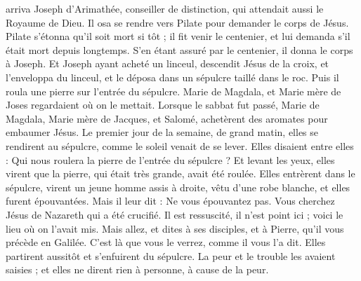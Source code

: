 \begin{multicols}{2}
arriva Joseph d'Arimathée, conseiller de distinction, qui attendait aussi le Royaume de Dieu. Il osa se rendre vers Pilate pour demander le corps de Jésus.
Pilate s'étonna qu'il soit mort si tôt ; il fit venir le centenier, et lui demanda s'il était mort depuis longtemps.
S’en étant assuré par le centenier, il donna le corps à Joseph.
Et Joseph ayant acheté un linceul, descendit Jésus de la croix, et l'enveloppa du linceul, et le déposa dans un sépulcre taillé dans le roc. Puis il roula une pierre sur l'entrée du sépulcre.
Marie de Magdala, et Marie mère de Joses regardaient où on le mettait.
\VerseOne{}Lorsque le sabbat fut passé, Marie de Magdala, Marie mère de Jacques, et Salomé, achetèrent des aromates pour embaumer Jésus.
Le premier jour de la semaine, de grand matin, elles se rendirent au sépulcre, comme le soleil venait de se lever.
Elles disaient entre elles : Qui nous roulera la pierre de l'entrée du sépulcre ?
Et levant les yeux, elles virent que la pierre, qui était très grande, avait été roulée.
Elles entrèrent dans le sépulcre, virent un jeune homme assis à droite, vêtu d'une robe blanche, et elles furent épouvantées.
Mais il leur dit : Ne vous épouvantez pas. Vous cherchez Jésus de Nazareth qui a été crucifié. Il est ressuscité, il n'est point ici ; voici le lieu où on l'avait mis.
Mais allez, et dites à ses disciples, et à Pierre, qu'il vous précède en Galilée. C’est là que vous le verrez, comme il vous l'a dit.
Elles partirent aussitôt et s'enfuirent du sépulcre. La peur et le trouble les avaient saisies ; et elles ne dirent rien à personne, à cause de la peur.

\end{multicols}
